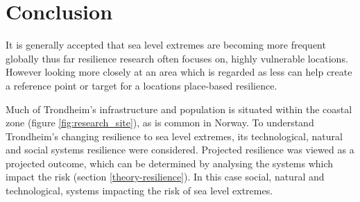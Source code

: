 


\chapter{Conclusion}

It is generally accepted that sea level extremes are becoming more frequent globally thus far resilience research often focuses on, highly vulnerable locations. However looking more closely at an area which is regarded as less can help create a reference point or target for a locations place-based resilience.

Much of Trondheim's infrastructure and population is situated within the coastal zone (figure \ref{fig:research_site}), as is common in Norway. To understand Trondheim's changing resilience to sea level extremes, its technological, natural and social systems resilience were considered.  Projected resilience was viewed as a projected outcome, which can be determined by analysing the systems which impact the risk (section \ref{theory-resilience}). In this case social, natural and technological, systems impacting the risk of sea level extremes. 
\paragraph{}

